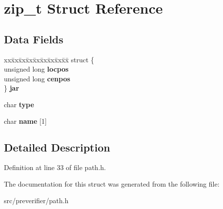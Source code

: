 \section{zip\_\-t Struct Reference}
\label{structzip__t}
\subsection*{Data Fields}
\begin{DoxyCompactItemize}
\item 
\begin{tabbing}
xx\=xx\=xx\=xx\=xx\=xx\=xx\=xx\=xx\=\kill
struct \{\\
\>unsigned long {\bfseries locpos}\\
\>unsigned long {\bfseries cenpos}\\
\} {\bfseries jar}\label{structzip__t_a1b0c37246dc28a77190e89886f9a9e43}
\\

\end{tabbing}\item 
char {\bfseries type}\label{structzip__t_ae12c492ce3fa5e2a8079f53076d5b396}

\item 
char {\bfseries name} [1]\label{structzip__t_a74b5cd8b36a22fc2c080d9ba64686d9f}

\end{DoxyCompactItemize}


\subsection{Detailed Description}


Definition at line 33 of file path.h.



The documentation for this struct was generated from the following file:\begin{DoxyCompactItemize}
\item 
src/preverifier/path.h\end{DoxyCompactItemize}
